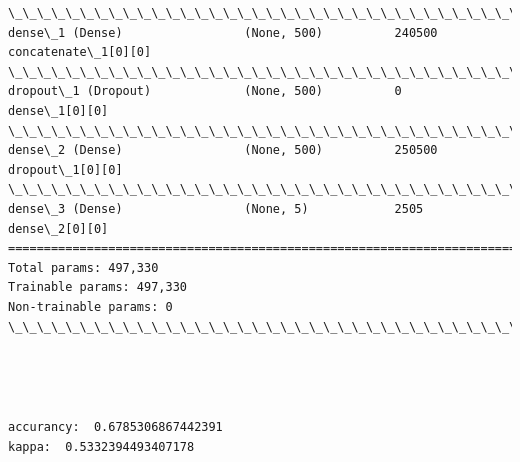 \documentclass[11pt]{article}
\begin{document}
\begin{Verbatim}[commandchars=\\\{\}]
\_\_\_\_\_\_\_\_\_\_\_\_\_\_\_\_\_\_\_\_\_\_\_\_\_\_\_\_\_\_\_\_\_\_\_\_\_\_\_\_\_\_\_\_\_\_\_\_\_\_\_\_\_\_\_\_\_\_\_\_\_\_\_\_\_\_\_\_\_\_\_\_\_\_\_\_\_\_\_\_\_\_\_\_\_\_\_\_\_\_\_\_\_\_\_\_\_\_
dense\_1 (Dense)                 (None, 500)          240500      concatenate\_1[0][0]              
\_\_\_\_\_\_\_\_\_\_\_\_\_\_\_\_\_\_\_\_\_\_\_\_\_\_\_\_\_\_\_\_\_\_\_\_\_\_\_\_\_\_\_\_\_\_\_\_\_\_\_\_\_\_\_\_\_\_\_\_\_\_\_\_\_\_\_\_\_\_\_\_\_\_\_\_\_\_\_\_\_\_\_\_\_\_\_\_\_\_\_\_\_\_\_\_\_\_
dropout\_1 (Dropout)             (None, 500)          0           dense\_1[0][0]                    
\_\_\_\_\_\_\_\_\_\_\_\_\_\_\_\_\_\_\_\_\_\_\_\_\_\_\_\_\_\_\_\_\_\_\_\_\_\_\_\_\_\_\_\_\_\_\_\_\_\_\_\_\_\_\_\_\_\_\_\_\_\_\_\_\_\_\_\_\_\_\_\_\_\_\_\_\_\_\_\_\_\_\_\_\_\_\_\_\_\_\_\_\_\_\_\_\_\_
dense\_2 (Dense)                 (None, 500)          250500      dropout\_1[0][0]                  
\_\_\_\_\_\_\_\_\_\_\_\_\_\_\_\_\_\_\_\_\_\_\_\_\_\_\_\_\_\_\_\_\_\_\_\_\_\_\_\_\_\_\_\_\_\_\_\_\_\_\_\_\_\_\_\_\_\_\_\_\_\_\_\_\_\_\_\_\_\_\_\_\_\_\_\_\_\_\_\_\_\_\_\_\_\_\_\_\_\_\_\_\_\_\_\_\_\_
dense\_3 (Dense)                 (None, 5)            2505        dense\_2[0][0]                    
==================================================================================================
Total params: 497,330
Trainable params: 497,330
Non-trainable params: 0
\_\_\_\_\_\_\_\_\_\_\_\_\_\_\_\_\_\_\_\_\_\_\_\_\_\_\_\_\_\_\_\_\_\_\_\_\_\_\_\_\_\_\_\_\_\_\_\_\_\_\_\_\_\_\_\_\_\_\_\_\_\_\_\_\_\_\_\_\_\_\_\_\_\_\_\_\_\_\_\_\_\_\_\_\_\_\_\_\_\_\_\_\_\_\_\_\_\_

    \end{Verbatim}

    \begin{center}
    \end{center}
    { \hspace*{\fill} \\}
    
    \begin{center}
    \end{center}
    { \hspace*{\fill} \\}
    
    \begin{Verbatim}[commandchars=\\\{\}]
accurancy:  0.6785306867442391
kappa:  0.5332394493407178

    \end{Verbatim}
\end{document}
